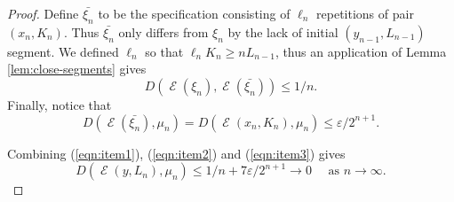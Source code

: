 \documentclass[10pt,a4paper]{amsart}
\DeclareMathOperator{\Emp}{\mathcal{E}}%
\newcommand{\eps}{\varepsilon}
\begin{document}
\begin{proof}
Define $\bar{\xi_n}$ to be the specification consisting of $\ell_n$ repetitions of pair $(x_n, K_n)$. Thus $\bar{\xi_n}$ only differs from $\xi_n$ by the lack of initial $(y_{n-1}, L_{n-1})$ segment. We defined $\ell_n$ so that $\ell_n K_n \ge n L_{n-1}$, thus an application of Lemma \ref{lem:close-segments} gives
\begin{equation} \label{eqn:item2}
D(\Emp(\xi_n), \Emp(\bar{\xi_n})) \le 1/n.
\end{equation}
Finally, notice that
\begin{equation} \label{eqn:item3}
D(\Emp(\bar{\xi_n}), \mu_n) = D(\Emp(x_n, K_n), \mu_n) \le \eps / 2^{n+1}.
\end{equation}

Combining (\ref{eqn:item1}), (\ref{eqn:item2}) and (\ref{eqn:item3}) gives
\begin{equation} \label{eqn:emp_measure_Ln}
D(\Emp(y, L_n), \mu_n) \le 1/n + 7 \eps/2^{n+1} \to 0 \quad \textrm{ as } n \to \infty.
\end{equation}


\end{proof}
\end{document}
